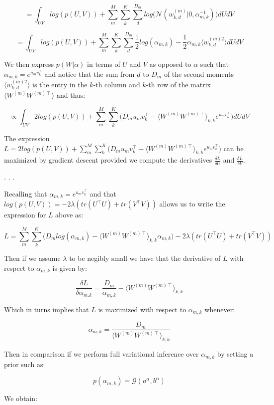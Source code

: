 \documentclass{article}
\begin{document}
$$ = \int_{UV}{log(p(U,V)) + \sum_m^M{\sum_k^K{\sum_d^{D_m}{log\Big(\mathcal{N}(w_{k,d}^{(m)}|0,\alpha_{m,k}^{-1})\Big)}}}dUdV}$$

$$ = \int_{UV}{log(p(U,V)) + \sum_m^M{\sum_k^K{\sum_d^{D_m}{\frac{1}{2}log(\alpha_{m,k}) - \frac{1}{2}\alpha_{m,k}\langle w_{k,d}^{(m)2}\rangle }}}dUdV}$$

We then express $p(W|\alpha)$ in terms of $U$ and $V$ as opposed to $\alpha$ such that $\alpha_{m,k} = e^{u_m v_k^\intercal}$ and notice that the sum from $d$ to $D_m$ of the second moments $\langle w_{k,d}^{(m)2}\rangle$ is the entry in the $k$-th column and $k$-th row of the matrix $\langle W^{(m)}W^{(m)\intercal}\rangle$ and thus:

$$\propto \int_{UV}{2log(p(U,V)) + \sum_m^M{\sum_k^K{\Big(D_m u_m v_k^\intercal - \langle W^{(m)}W^{(m)\intercal}\rangle_{k,k}e^{u_m v_k^\intercal}  \Big) }}dUdV}$$

The expression $L = 2log(p(U,V)) + \sum_m^M{\sum_k^K{\Big(D_m u_m v_k^\intercal - \langle W^{(m)}W^{(m)\intercal}\rangle_{k,k}e^{u_m v_k^\intercal}  \Big) }}$ can be maximized by gradient descent provided we compute the derivatives $\frac{\delta L}{\delta U}$ and $\frac{\delta L}{\delta V}$.

.
.
.

Recalling that $\alpha_{m,k} = e^{u_m v_k^\intercal}$ and that $log(p(U,V)) = -2\lambda (tr(U^\intercal U) + tr(V^\intercal V))$ allows us to write the expression for $L$ above as:  

$$L = \sum_m^M{\sum_k^K{\Big(D_mlog(\alpha_{m,k}) - \langle W^{(m)}W^{(m)\intercal}\rangle_{k,k} \alpha_{m,k}}}\Big)-2\lambda (tr(U^\intercal U) + tr(V^\intercal V))$$

Then if we assume $\lambda$ to be negibly small we have that the derivative of $L$ with respect to $\alpha_{m,k}$ is given by:

$$\frac{\delta L}{\delta \alpha_{m.k}} = \frac{D_m}{\alpha_{m,k}} - \langle W^{(m)}W^{(m)\intercal}\rangle_{k,k}$$

Which in turns implies that $L$ is maximized with respect to $\alpha_{m,k}$ whenever:

$$\alpha_{m,k} = \frac{D_m}{\langle W^{(m)}W^{(m)\intercal}\rangle_{k,k}}$$

Then in comparison if we perform full variational inference over $\alpha_{m,k}$ by setting a prior such as:

$$p(\alpha_{m,k}) = \mathcal{G}(a^\alpha,b^\alpha)$$

We obtain:
\end{document}

